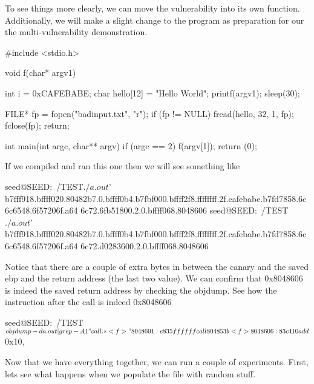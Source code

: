To see things more clearly, we can move the vulnerability into its own function. Additionally, we will make a slight change to the program as preparation for our the multi-vulnerability demonstration. 

\begin{code} 
#include <stdio.h> 
 
void f(char* argv1) 
{   
  int i = 0xCAFEBABE; 
  char hello[12] = "Hello World\n";  
  printf(argv1);  
  sleep(30); 
 
  FILE* fp = fopen("badinput.txt", "r");  
  if (fp != NULL)   
  {
    fread(hello, 32, 1, fp); 
    fclose(fp); 
  }     
  return; 
}   

int main(int argc, char** argv) 
{ 
  if (argc == 2) 
  {  
    f(argv[1]);
  }  
  return (0); 
} 
\end{code}
 
If we compiled and ran this one then we will see something like 

\begin{code} 
seed@SEED:~/TEST$ ./a.out $'%
b7fff918.bffff020.80482b7.0.bffff0b4.b7fbf000.bffff2f8.ffffffff.2f.cafebabe.b7fd7858.6c6c6548.6f57206f.a64 
6c72.6fb51800.2.0.bffff068.8048606 
seed@SEED:~/TEST$ ./a.out $'%
b7fff918.bffff020.80482b7.0.bffff0b4.b7fbf000.bffff2f8.ffffffff.2f.cafebabe.b7fd7858.6c6c6548.6f57206f.a64 
6c72.d0283600.2.0.bffff068.8048606 
\end{code} 
 
Notice that there are a couple of extra bytes in between the canary and the saved ebp and the return address (the last two value). We can confirm that 0x8048606 is indeed the saved return address by checking the objdump. See how the instruction after the call is indeed 0x8048606 

\begin{code} 
seed@SEED:~/TEST$ objdump -d a.out | grep -A 1 "call.*<f>"  
 8048601: e8 35 ff ff ff call   804853b <f> 
 8048606: 83 c4 10 add    $0x10,%
\end{code}
 
Now that we have everything together, we can run a couple of experiments. First, lets see what happens when we populate the file with random stuff. 

 
